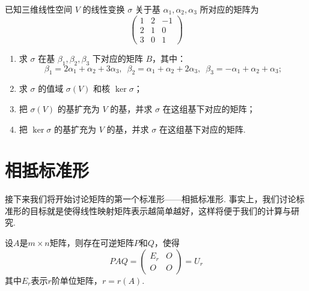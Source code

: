 \begin{example}
    已知三维线性空间 $V$ 的线性变换 $\sigma$ 关于基 $\alpha_1,\alpha_2,\alpha_3$ 所对应的矩阵为
    \[\begin{pmatrix}1 & 2 & -1 \\ 2 & 1 & 0 \\ 3 & 0 & 1\end{pmatrix}\]
    \begin{enumerate}
        \item 求 $\sigma$ 在基 $\beta_1,\beta_2,\beta_3$ 下对应的矩阵 $B$，其中：
              \[\beta_1=2\alpha_1+\alpha_2+3\alpha_3,\enspace \beta_2=\alpha_1+\alpha_2+2\alpha_3,\enspace \beta_3=-\alpha_1+\alpha_2+\alpha_3;\]

        \item 求 $\sigma$ 的值域 $\sigma(V)$ 和核 $\ker\sigma$；

        \item 把 $\sigma(V)$ 的基扩充为 $V$ 的基，并求 $\sigma$ 在这组基下对应的矩阵；

        \item 把 $\ker\sigma$ 的基扩充为 $V$ 的基，并求 $\sigma$ 在这组基下对应的矩阵.
    \end{enumerate}
\end{example}

\begin{solution}

\end{solution}

\section{相抵标准形}

接下来我们将开始讨论矩阵的第一个标准形——相抵标准形. 事实上，我们讨论标准形的目标就是使得线性映射矩阵表示越简单越好，这样将便于我们的计算与研究.
\begin{theorem}\label{thm:11:相抵标准形}
    设$A$是$m\times n$矩阵，则存在可逆矩阵$P$和$Q$，使得
    \[PAQ=\begin{pmatrix}
            E_r & O \\ O & O
        \end{pmatrix}=U_r\]
    其中$E_r$表示$r$阶单位矩阵，$r=r(A)$.
\end{theorem}

